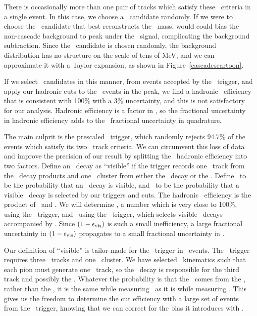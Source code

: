 \documentclass{cornell}
\begin{document}
There is occasionally more than one pair of tracks which satisfy these
\pipi\ criteria in a single event.  In this case, we choose a \pipi\
candidate randomly.  If we were to choose the \pipi\ candidate that
best reconstructs the \us\ mass, would could bias the non-cascade
background to peak under the \twotoone\ signal, complicating the
background subtraction.  Since the \pipi\ candidate is chosen
randomly, the background distribution has no structure on the scale of
tens of MeV, and we can approximate it with a Taylor expansion, as
shown in Figure~\ref{cascadescartoon}.

If we select \twotoone\ candidates in this manner, from events
accepted by the \twotrack\ trigger, and apply our hadronic cuts to the
\us\ events in the peak, we find a hadronic \us\ efficiency that is
consistent with 100\% with a 3\% uncertainty, and this is not
satisfactory for our analysis.  Hadronic efficiency is a factor in
\geehadtot, so the fractional uncertainty in hadronic efficiency adds
to the \geehadtot\ fractional uncertainty in quadrature.

The main culprit is the prescaled \twotrack\ trigger, which randomly
rejects 94.7\% of the events which satisfy its two \axial\ track
criteria.  We can circumvent this loss of data and improve the
precision of our result by splitting the \us\ hadronic efficiency into
two factors.  Define an \us\ decay as ``visible'' if the trigger
records one \axial\ track from the \us\ decay products and one \cblo\
cluster from either the \us\ decay or the \pipi.  Define \evis\ to be
the probability that an \us\ decay is visible, and \ecuts\ to be the
probability that a visible \us\ decay is selected by our triggers and
cuts.  The hadronic \us\ efficiency is the product of \evis\ and
\ecuts.  We will determine \evis, a number which is very close to
100\%, using the \twotrack\ trigger, and \ecuts\ using the \hadron\
trigger, which selects visible \us\ decays accompanied by \pipi.
Since $(1-\epsilon_{\mbox{\scriptsize vis}})$ is such a small inefficiency, a large
fractional uncertainty in $(1-\epsilon_{\mbox{\scriptsize vis}})$ propagates to a
small fractional uncertainty in \evis.

Our definition of ``visible'' is tailor-made for the \hadron\ trigger
in \twotoone\ events.  The \hadron\ trigger requires three \axial\
tracks and one \cblo\ cluster.  We have selected \pipi\ kinematics
such that each pion must generate one \axial\ track, so the \us\ decay
is responsible for the third track and possibly the \cblo.  Whatever
the probability is that the \cblo\ comes from the \pipi, rather than
the \us, it is the same while measuring \evis\ as it is while
measuring \ecuts.  This gives us the freedom to determine the cut
efficiency with a large set of events from the \hadron\ trigger,
knowing that we can correct for the bias it introduces with \evis.
\end{document}
